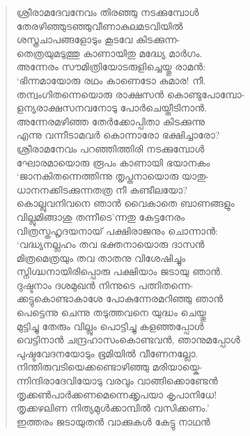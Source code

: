 \begin{verse}
ശ്രീരാമദേവനേവം തിരഞ്ഞു നടക്കുമ്പോള്‍\\
തേരഴിഞ്ഞുടഞ്ഞുവീണാകുലമടവിയില്‍\\
ശസ്ത്രചാപങ്ങളോടും കൂടവേ കിടക്കുന്ന-\\
തെത്രയുമടുത്തു കാണായിതു മദ്ധ്യേ മാര്‍ഗം.\\
അന്നേരം സൗമിത്രിയോടരുളിച്ചെയ്തു രാമന്‍:\\
‘ഭിന്നമായോരു രഥം കാണെടോ കുമാര! നീ.\\
തന്വംഗിതന്നെയൊരു രാക്ഷസന്‍ {\fontsize{13pt}{15pt}\selectfont കൊണ്ടുപോമ്പോ-}\\
ളന്യരാക്ഷസനവനോടു പോര്‍ചെയ്തീടിനാന്‍.\\
അന്നേരമഴിഞ്ഞ തേര്‍ക്കോപ്പിതാ കിടക്കുന്നു\\
എന്നു വന്നീടാമവര്‍ കൊന്നാരോ ഭക്ഷിച്ചാരോ?\\
ശ്രീരാമനേവം പറഞ്ഞിത്തിരി നടക്കുമ്പോള്‍\\
ഘോരമായൊരു രൂപം കാണായി ഭയാനകം\\
‘ജാനകിതന്നെത്തിന്നു തൃപ്തനായൊരു യാതു-\\
ധാനനക്കിടക്കുന്നതത്ര നീ കണ്ടീലയോ?\\
കൊല്ലുവനിവനെ ഞാന്‍ വൈകാതെ ബാണങ്ങളും\\
വില്ലുമിങ്ങാശു തന്നീടെ’ന്നതു കേട്ടനേരം\\
വിത്രസ്തഹൃദയനായ് പക്ഷിരാജനും ചൊന്നാന്‍:\\
‘വദ്ധ്യനല്ലഹം തവ ഭക്തനായൊരു ദാസന്‍\\
മിത്രമെത്രയും തവ താതനു വിശേഷിച്ചും\\
സ്നിഗ്ദ്ധനായിരിപ്പൊരു പക്ഷിയാം ജടായു ഞാന്‍.\\
ദുഷ്ടനാം ദശമുഖന്‍ നിന്നുടെ പത്നിതന്നെ-\\
ക്കട്ടുകൊണ്ടാകാശേ പോകുന്നേരമറിഞ്ഞു ഞാന്‍\\
പെട്ടെന്നു ചെന്നു തടുത്തവനെ യുദ്ധം ചെയ്തു\\
മുട്ടിച്ചു തേരും വില്ലും പൊട്ടിച്ചു കളഞ്ഞപ്പോള്‍\\
വെട്ടിനാന്‍ ചന്ദ്രഹാസംകൊണ്ടവന്‍, ഞാനുമപ്പോള്‍\\
പുഷ്ടവേദനയോടും ഭൂമിയില്‍ വീണേനല്ലോ.\\
നിന്തിരുവടിയെക്കണ്ടൊഴിഞ്ഞു മരിയായ്കെ-\\
ന്നിന്ദിരാദേവിയോടു വരവും വാങ്ങിക്കൊണ്ടേന്‍\\
തൃക്കണ്‍പാര്‍ക്കണമെന്നെക്കൃപയാ കൃപാനിധേ!\\
തൃക്കഴലിണ നിത്യമുള്‍ക്കാമ്പില്‍ വസിക്കണം.’\\
ഇത്തരം ജടായുതന്‍ വാക്കുകള്‍ കേട്ടു നാഥന്‍\\

\end{verse}
